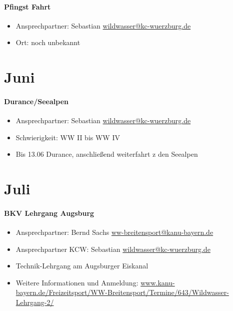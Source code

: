 \documentclass[12pt, a4paper]{report}
\begin{document}
\paragraph{Pfingst Fahrt}
\begin{itemize}
    \item Ansprechpartner: Sebastian \href{mailto:wildwasser@kc-wuerzburg.de}{wildwasser@kc-wuerzburg.de}
    \item Ort: noch unbekannt
\end{itemize}

\section*{Juni}\paragraph{Durance/Seealpen}
\begin{itemize}
    \item Ansprechpartner: Sebastian \href{mailto:wildwasser@kc-wuerzburg.de}{wildwasser@kc-wuerzburg.de}
    \item Schwierigkeit: WW II bis WW IV
    \item Bis 13.06 Durance, anschließend weiterfahrt z den Seealpen
\end{itemize}

\section*{Juli}\paragraph{BKV Lehrgang Augsburg}
\begin{itemize}
    \item Ansprechpartner: Bernd Sachs \href{mailto:ww-breitensport@kanu-bayern.de}{ww-breitensport@kanu-bayern.de}
    \item Ansprechpartner KCW: Sebastian \href{mailto:wildwasser@kc-wuerzburg.de}{wildwasser@kc-wuerzburg.de}
    \item Technik-Lehrgang am Augsburger Eiskanal
    \item Weitere Informationen und Anmeldung: \url{www.kanu-bayern.de/Freizeitsport/WW-Breitensport/Termine/643/Wildwasser-Lehrgang-2/}
\end{itemize}
\end{document}

